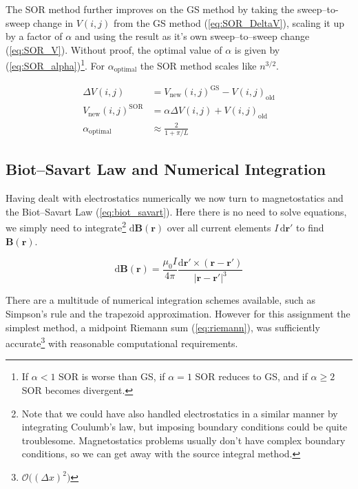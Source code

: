 \documentclass[notitlepage,aps,prd,nofootinbib]{revtex4-1}
\DeclareRobustCommand{\orderof}{\ensuremath{\mathcal{O}}}
\begin{document}
The SOR method further improves on the GS method by taking the sweep--to-sweep change in $V\left(i,j\right)$ from the GS method (\ref{eq:SOR_DeltaV}), scaling it up by a factor of $\alpha$ and using the result as it's own sweep--to--sweep change (\ref{eq:SOR_V}). Without proof, the optimal value of $\alpha$ is given by (\ref{eq:SOR_alpha})\footnote{If $\alpha < 1$ SOR is worse than GS, if $\alpha = 1$ SOR reduces to GS, and if $\alpha \geq 2$ SOR becomes divergent.}. For $\alpha_{\mathrm{optimal}}$ the SOR method scales like $n^{3/2}$.

\begin{align}
\Delta V\left(i,j\right) &= V_{\mathrm{new}}\left(i,j\right)^{\mathrm{GS}} - V\left(i,j\right)_{\mathrm{old}} \label{eq:SOR_DeltaV} \\
V_{\mathrm{new}}\left(i,j\right)^{\mathrm{SOR}} &= \alpha \Delta V\left(i,j\right) + V\left(i,j\right)_{\mathrm{old}} \label{eq:SOR_V} \\
\alpha_{\mathrm{optimal}} &\approx \frac{2}{1+\pi/L} \label{eq:SOR_alpha} 
\end{align}

\subsection{Biot--Savart Law and Numerical Integration}
\label{subsec:biot_savart_theory}
Having dealt with electrostatics numerically we now turn to magnetostatics and the Biot--Savart Law (\ref{eq:biot_savart}). Here there is no need to solve equations, we simply need to integrate\footnote{Note that we could have also handled electrostatics in a similar manner by integrating Coulumb's law, but imposing boundary conditions could be quite troublesome. Magnetostatics problems usually don't have complex boundary conditions, so we can get away with the source integral method.} $\mathrm{d}\mathbf{B}\left(\mathbf{r}\right)$ over all current elements $I\,\mathrm{d}\mathbf{r}'$ to find $\mathbf{B}\left(\mathbf{r}\right)$.

\begin{equation} \label{eq:biot_savart}
\mathrm{d}\mathbf{B}\left(\mathbf{r}\right) = \frac{\mu_{0}I}{4\pi} \frac{\mathrm{d}\mathbf{r}' \times \left(\mathbf{r} - \mathbf{r}'\right)}{\left|\mathbf{r} - \mathbf{r}'\right|^{3}}
\end{equation}

There are a multitude of numerical integration schemes available, such as Simpson's rule and the trapezoid approximation. However for this assignment the simplest method, a midpoint Riemann sum (\ref{eq:riemann}), was sufficiently accurate\footnote{$\orderof\big(\left(\Delta x\right)^2\big)$} with reasonable computational requirements.
\end{document}
